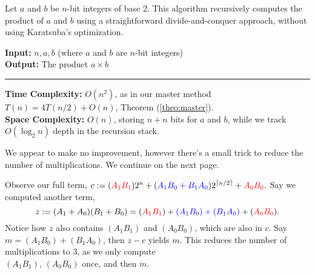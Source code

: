 \begin{Func}
    Let $a$ and $b$ be $n$-bit integers of base 2. This algorithm recursively computes the product of $a$ and $b$ using a straightforward divide-and-conquer approach, without using Karatsuba's optimization.

    \vspace{.5em}
    \noindent
    \textbf{Input:} $n, a, b$ (where $a$ and $b$ are $n$-bit integers)\\
    \textbf{Output:} The product $a \times b$\\

    \begin{algorithm}[H]
        \SetAlgoLined
    \end{algorithm}
    \noindent\rule{\textwidth}{0.4pt}

    \noindent
    \textbf{Time Complexity:} $O(n^2)$, as in our master method $T(n)=4T(n/2)+O(n)$, Theorem (\ref{theo:master}).\\
    \textbf{Space Complexity:} $O(n)$, storing $n+n$ bits for $a$ and $b$, while we track $O(\log_2 n)$ depth in the recursion stack.
\end{Func}
\noindent
We appear to make no improvement, however there's a small trick to reduce the number of multiplications. We continue on the next page.

\newpage

\noindent
Observe our full term, $c:=(\textcolor{red}{A_1B_1})2^{n}+(\textcolor{blue}{A_1B_0+B_1A_0})2^{\lceil n/2\rceil}+\textcolor{red}{A_0B_0}.$ Say we computed another term,
\[z:=(A_1+A_0)(B_1+B_0)=(\textcolor{red}{A_1B_1})+\textcolor{blue}{(A_1B_0)+(B_1A_0)}+(\textcolor{red}{A_0B_0}).\]
\noindent
Notice how $z$ also contains $(A_1B_1)$ and $(A_0B_0)$, which are also in $c$. Say
$m=(A_1B_0)+(B_1A_0)$, then $z-c$ yields $m$. This reduces the number of multiplications to 3, as we only compute\\
 $(A_1B_1)$, $(A_0B_0)$ once, and then $m$.\\

